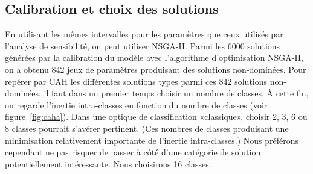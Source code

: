 \subsection{Calibration et choix des solutions}

En utilisant les mêmes intervalles pour les paramètres que ceux utilisés par l'analyse de sensibilité, on peut utiliser NSGA-II.
% 
Parmi les 6000 solutions générées par la calibration du modèle avec l'algorithme d'optimisation NSGA-II, on a obtenu 842 jeux de paramètres produisant des solutions non-dominées.
Pour repérer par CAH les différentes solutions types parmi ces 842 solutions non-dominées, il faut dans un premier temps choisir un nombre de classes.
À cette fin, on regarde l'inertie intra-classes en fonction du nombre de classes (voir figure~\ref{fig:caha}).
Dans une optique de classification «classique», choisir 2, 3, 6 ou 8 classes pourrait s'avérer pertinent.
(Ces nombres de classes produisant une minimisation relativement importante de l'inertie intra-classes.)
Nous préférons cependant ne pas risquer de passer à côté d'une catégorie de solution potentiellement intéressante.
Nous choisirons 16 classes.

